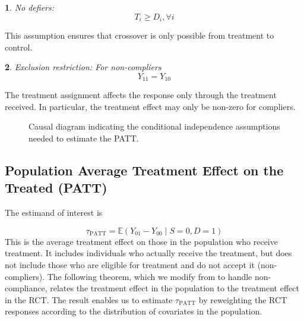 \documentclass[12pt]{article}
\makeatletter
\newtheorem*{assumption*}{\assumptionnumber}
\providecommand{\assumptionnumber}{}
\newenvironment{assumption}[2]
 {%
  \renewcommand{\assumptionnumber}{Assumption #1}%
  \begin{assumption*}%
  \protected@edef\@currentlabel{#1}%
 }
 {%
  \end{assumption*}
 }
\newcommand{\ex}{\mathbb{E}} %
\makeatother
\begin{document}
\begin{assumption}{6}{}\label{monotonicity}
No defiers: 
\begin{equation*}
T_i \geq D_i, \forall i
\end{equation*}
\end{assumption}
\noindent This assumption ensures that crossover is only possible from treatment to control.

\begin{assumption}{7}{}\label{ER}
Exclusion restriction: For non-compliers
\begin{equation*}
Y_{11} = Y_{10}
\end{equation*}  
\end{assumption}
\noindent The treatment assignment affects the response only through the treatment received.  In particular, the treatment effect may only be non-zero for compliers.  

\begin{figure}[h]
\centering
{}
\caption{Causal diagram indicating the conditional independence assumptions needed to estimate the PATT.}\label{fig:DAG}
\end{figure}

\subsection{Population Average Treatment Effect on the Treated (PATT)}
The estimand of interest is 

\begin{equation}
\tau_{\text{PATT}} = \ex\left( Y_{01} - Y_{00} \mid S=0, D=1\right)
\end{equation}
This is the average treatment effect on those in the population who receive treatment.  It includes individuals who actually receive the treatment, but does not include those who are eligible for treatment and do not accept it (non-compliers).  The following theorem, which we modify from \cite{Hartman} to handle non-compliance, relates the treatment effect in the population to the treatment effect in the RCT. The result enables us to estimate $\tau_{\text{PATT}}$ by reweighting the RCT responses according to the distribution of covariates in the population. 
\end{document}
